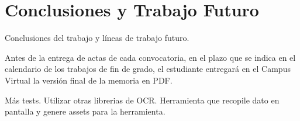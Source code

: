 \chapter{Conclusiones y Trabajo Futuro}
\label{cap:conclusiones}

Conclusiones del trabajo y líneas de trabajo futuro.

Antes de la entrega de actas de cada convocatoria, en el plazo que se indica en el calendario de los trabajos de fin de grado, el estudiante entregará en el Campus Virtual la versión final de la memoria en PDF.


Más tests.
Utilizar otras librerias de OCR.
Herramienta que recopile dato en pantalla y genere assets para la herramienta.
